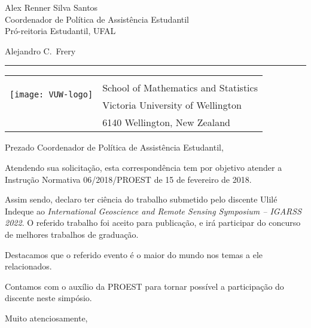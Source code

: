 \documentclass[12pt]{letter} %
\begin{document}
\signature{\texttt{[image: assinatura\_blue-no\_background]}\\
Alejandro C.\ Frery\\
\mbox{Professor of Statistics and Data Science}\\
alejandro.frery@vuw.ac.nz}           %
\longindentation=0pt                       %
\let\raggedleft\raggedright                %
 
\begin{letter}{Alex Renner Silva Santos\\
		Coordenador de Política de Assistência Estudantil\\
		Pró-reitoria Estudantil, UFAL}
\date{23 de maio de 2022}

\begin{flushleft}
Alejandro C.\ Frery
\end{flushleft}
\smallskip\hrule height 2pt
\begin{flushright}
\begin{tabular}{rl}
\multirow{3}{*}[20pt]{\texttt{[image: VUW-logo]}}	\\
& \small School of Mathematics and Statistics\\
	& \small Victoria University of Wellington\\
	& \small  6140 Wellington, New Zealand
\end{tabular}
\end{flushright} 
\vfill %

\opening{Prezado Coordenador de Política de Assistência Estudantil,} 

Atendendo sua solicitação, esta correspondência tem por objetivo atender a Instrução Normativa 06/2018/PROEST de 15 de fevereiro de 2018.

Assim sendo, declaro ter ciência do trabalho submetido pelo discente Ulilé Indeque ao \textit{International Geoscience and Remote Sensing Symposium -- IGARSS 2022}.
O referido trabalho foi aceito para publicação, e irá participar do concurso de melhores trabalhos de graduação.

Destacamos que o referido evento é o maior do mundo nos temas a ele relacionados.

Contamos com o auxílio da PROEST para tornar possível a participação do discente neste simpósio.

\closing{Muito atenciosamente,} 
  

\end{letter}
\end{document}

